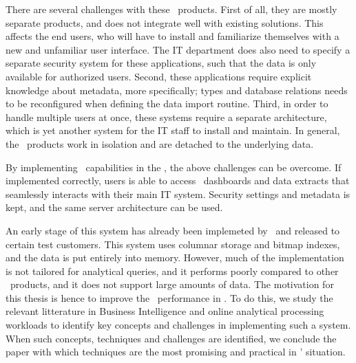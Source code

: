 There are several challenges with these \bd~products. First of all, they are mostly separate products, and does not integrate well with existing solutions. This affects the end users, who will have to install and familiarize themselves with a new and unfamiliar user interface. The IT department does also need to specify a separate security system for these applications, such that the data is only available for authorized users. Second, these applications require explicit knowledge about metadata, more specifically; types and database relations needs to be reconfigured when defining the data import routine. Third, in order to handle multiple users at once, these systems require a separate architecture, which is yet another system for the IT staff to install and maintain. In general, the \bd~products work in isolation and are detached to the underlying data.

By implementing \bd~capabilities in the \genusSoftware, the above challenges can be overcome. If implemented correctly, users is able to access \bd~dashboards and data extracts that seamlessly interacts with their main IT system. Security settings and metadata is kept, and the same server architecture can be used. 

An early stage of this system has already been implemeted by \genus~and released to certain test customers. This system uses columnar storage and bitmap indexes, and the data is put entirely into memory. However, much of the implementation is not tailored for analytical queries, and it performs poorly compared to other \bd~products, and it does not support large amounts of data. The motivation for this thesis is hence to improve the \bd~performance in \genusSoftware. To do this, we study the relevant litterature in Business Intelligence and online analytical processing workloads to identify key concepts and challenges in implementing such a system. When such concepts, techniques and challenges are identified, we conclude the paper with which techniques are the most promising and practical in \genus' situation.
